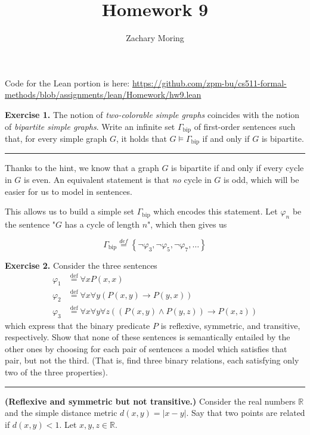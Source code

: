 \documentclass{article}
\title{Homework 9}
\author{Zachary Moring}
\newcommand{\Break}{\vspace{0.2cm}\hrule{}\vspace{0.2cm}}
\begin{document}
 \maketitle

Code for the Lean portion is here:
\url{https://github.com/zpm-bu/cs511-formal-methods/blob/assignments/lean/Homework/hw9.lean}

\vspace{2cm}

\noindent\textbf{Exercise 1.} The notion of \textit{two-colorable simple graphs}
coincides with the notion of \textit{bipartite simple graphs}. Write an infinite
set $\Gamma_\text{bip}$ of first-order sentences such that, for every simple
graph $G$, it holds that $G \vDash \Gamma_\text{bip}$ if and only if $G$ is
bipartite.

\Break{}

Thanks to the hint, we know that a graph $G$ is bipartite if and only if
every cycle in $G$ is even. An equivalent statement is that \textit{no} cycle
in $G$ is odd, which will be easier for us to model in sentences.

This allows us to build a simple set $\Gamma_\text{bip}$ which encodes this
statement. Let $\varphi_n$ be the sentence "$G$ has a cycle of length $n$",
which then gives us

\[
  \Gamma_\text{bip} \overset{def}{=} \left\{ \lnot \varphi_3, \lnot \varphi_5,
  \lnot \varphi_7, \dots \right\}
\]

\newpage{}

\noindent\textbf{Exercise 2.} Consider the three sentences
\begin{align*}
  \varphi_1 &\overset{\text{def}}{=} \forall x P(x, x)\\
  \varphi_2 &\overset{\text{def}}{=} \forall x \forall y (P(x, y) \to P(y, x))\\
  \varphi_3 &\overset{\text{def}}{=} \forall x \forall y \forall z
             ((P(x, y) \wedge P(y, z)) \to P(x, z))
\end{align*}
which express that the binary predicate $P$ is reflexive, symmetric, and
transitive, respectively. Show that none of these sentences is semantically
entailed by the other ones by choosing for each pair of sentences a model
which satisfies that pair, but not the third. (That is, find three binary
relations, each satisfying only two of the three properties).

\Break{}

\textbf{(Reflexive and symmetric but not transitive.)} Consider the real
numbers $\mathbb{R}$ and the simple distance metric $d(x, y) = |x - y|$. Say
that two points are related if $d(x, y) < 1$. Let $x, y, z \in \mathbb{R}$.
\end{document}
